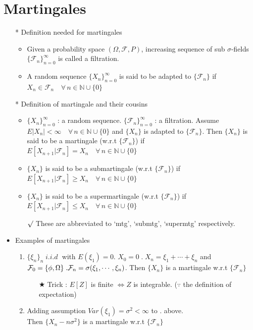 \documentclass[12pt, A4]{article}
\newcommand{\rmk}{$\surd$}
\newcommand{\trick}{$\bigstar$}
\newcommand{\N}{\mathbb{N}}
\newcommand{\F}{\mathcal{F}}
\newcommand{\foranyn}{\quad \forall \, n\in \N}
\begin{document}
\section{Martingales}
\smallskip
\begin{itemize}
	\item[*] Definition needed for martingales
	\begin{itemize}
		\item Given a probability space $(\Omega, \F, P)$, increasing sequence of sub $\sigma$-fields $\{\F_n\}_{n=0}^\infty$ is called a filtration.
		\item A random sequence $\{X_n\}_{n=0}^\infty$ is said to be adapted to $\{\F_n\}$ if $X_n\in \F_n \foranyn\cup\{0\}$
	\end{itemize} 
	\item[*] Definition of martingale and their cousins
	\begin{itemize}
		\item $\{X_n\}_{n=0}^\infty$ : a random sequence. $\{\F_n\}_{n=0}^\infty$ : a filtration. Assume $E|X_n|<\infty \foranyn\cup\{0\}$ and $\{X_n\}$ is adapted to $\{\F_n\}$. Then $\{X_n\}$ is said to be a martingale (w.r.t $\{\F_n\}$) if $E[X_{n+1}|\F_n]=X_n\foranyn\cup\{0\}$
		\item $\{X_n\}$ is said to be a submartingale (w.r.t $\{\F_n\}$) if $E[X_{n+1}|\F_n]\geq X_n\foranyn\cup\{0\}$
		\item $\{X_n\}$ is said to be a supermartingale (w.r.t $\{\F_n\}$) if $E[X_{n+1}|\F_n]\leq X_n\foranyn\cup\{0\}$
		\item[\rmk] These are abbreviated to `mtg', `submtg', `supermtg' respectively.
	\end{itemize} 
	\item Examples of martingales
	\begin{enumerate}
		\item $\{\xi_n\}_n\; i.i.d\;$ with $E(\xi_1)=0$. $X_0=0\;.\; X_n=\xi_1+\cdots +\xi_n$ and $\F_0=\{\phi, \Omega\}\;.\;\\ \F_n=\sigma(\xi_1, \cdots, \xi_n)$. Then $\{X_n\}$ is a martingale w.r.t $\{\F_n\}$
		\begin{itemize}
			\item[\trick] Trick : $E[Z]$ is finite $\Leftrightarrow Z$ is integrable. ($\because$ the definition of expectation)
		\end{itemize}
		\item Adding assumption $Var(\xi_1)=\sigma^2<\infty$ to  . above. \\Then $\{X_n-n\sigma^2\}$ is a martingale w.r.t $\{\F_n\}$

\end{enumerate}
\end{itemize}
\end{document}
